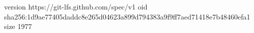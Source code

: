 version https://git-lfs.github.com/spec/v1
oid sha256:1d9ae77405daddc8e265d04623a899d794383a9f9ff7aed71418e7b48460efa1
size 1977
